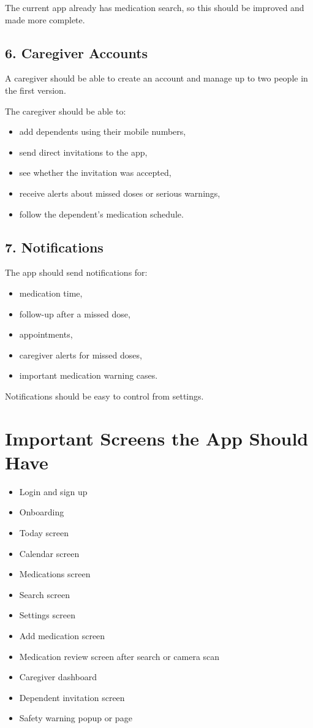 \documentclass[11pt,a4paper]{article}
\begin{document}
The current app already has medication search, so this should be improved and made more complete.

\subsection{6. Caregiver Accounts}
A caregiver should be able to create an account and manage up to two people in the first version.

The caregiver should be able to:
\begin{itemize}
    \item add dependents using their mobile numbers,
    \item send direct invitations to the app,
    \item see whether the invitation was accepted,
    \item receive alerts about missed doses or serious warnings,
    \item follow the dependent's medication schedule.
\end{itemize}

\subsection{7. Notifications}
The app should send notifications for:
\begin{itemize}
    \item medication time,
    \item follow-up after a missed dose,
    \item appointments,
    \item caregiver alerts for missed doses,
    \item important medication warning cases.
\end{itemize}

Notifications should be easy to control from settings.

\section{Important Screens the App Should Have}
\begin{itemize}
    \item Login and sign up
    \item Onboarding
    \item Today screen
    \item Calendar screen
    \item Medications screen
    \item Search screen
    \item Settings screen
    \item Add medication screen
    \item Medication review screen after search or camera scan
    \item Caregiver dashboard
    \item Dependent invitation screen
    \item Safety warning popup or page
\end{itemize}
\end{document}
